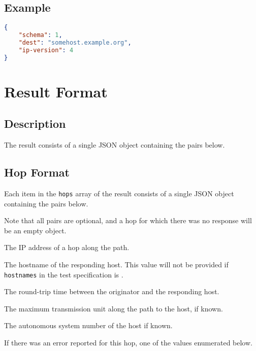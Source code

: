 \documentclass[10pt]{article}
\begin{document}
\subsection{Example}
\begin{lstlisting}[language=json]
{
    "schema": 1,
    "dest": "somehost.example.org",
    "ip-version": 4
}
\end{lstlisting}



%
%

\section{Result Format}

\subsection{Description}
The result consists of a single JSON object containing the pairs
below.  \seejson


\subsection{Hop Format}

Each item in the {\tt hops} array of the result consists of a single
JSON object containing the pairs below.  \seejson

Note that  all pairs are  optional, and a  hop for which there  was no
response will be an empty object.

 The IP address of a hop along the path.

 The hostname of the responding host.  This
value will not be provided if {\tt hostnames} in the test
specification is \false.

 The round-trip time between the originator
and the responding host.

 The maximum transmission unit along the path
to the host, if known.

 The autonomous system number of the host if
known.

 If there was an error reported for this hop,
one of the values enumerated below.
\end{document}
